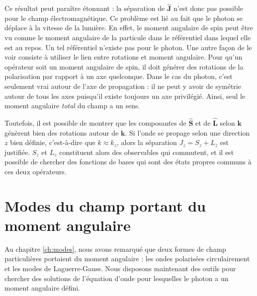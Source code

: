 Ce résultat peut paraître étonnant : la séparation de $\hat{\bm{J}}$ n'est donc pas possible pour le champ électromagnétique. Ce problème est lié au fait que le photon se déplace à la vitesse de la lumière. En effet, le moment angulaire de spin peut être vu comme le moment angulaire de la particule dans le référentiel dans lequel elle est au repos. Un tel référentiel n'existe pas pour le photon. Une autre façon de le voir consiste à utiliser le lien entre rotations et moment angulaire. Pour qu'un opérateur soit un moment angulaire de spin, il doit générer des rotations de la polarisation par rapport à un axe quelconque. Dans le cas du photon, c'est seulement vrai autour de l'axe de propagation : il ne peut y avoir de symétrie autour de tous les axes puisqu'il existe toujours un axe privilégié. Ainsi, seul le moment angulaire \textit{total} du champ a un sens.

Toutefois, il est possible de montrer  que les composantes de $\hat{\bm{S}}$ et de $\hat{\bm{L}}$ selon $\bm{k}$ génèrent bien des rotations autour de $\bm{k}$. Si l'onde se propage selon une direction $z$ bien définie, c'est-à-dire que $k\approx k_z$, alors la séparation $J_z = S_z + L_z$ est justifiée. $S_z$ et $L_z$ constituent alors des observables qui commutent, et il est possible de chercher des fonctions de bases qui sont des états propres communs à ces deux opérateurs.

\chapter{Modes du champ portant du moment angulaire}
Au chapitre \ref{ch:modes}, nous avons remarqué que deux formes de champ particulières portaient du moment angulaire : les ondes polarisées circulairement et les modes de Laguerre-Gauss. Nous disposons maintenant des outils pour chercher des solutions de l'équation d'onde pour lesquelles le photon a un moment angulaire défini.

